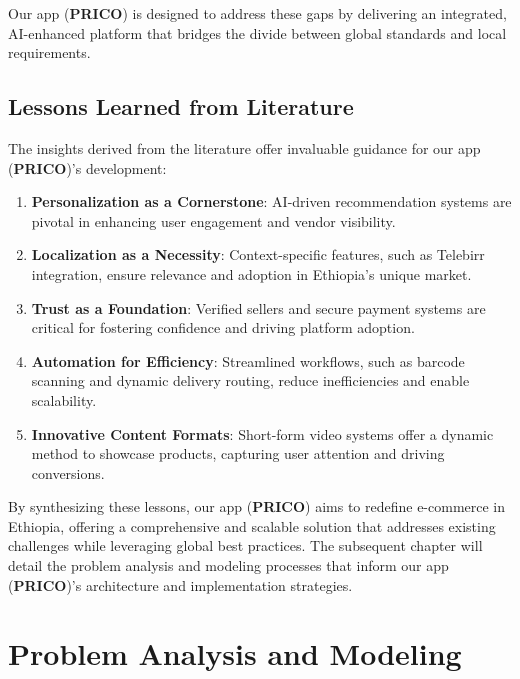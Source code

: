 \documentclass[12pt]{report}
\begin{document}
Our app (\textbf{PRICO}) is designed to address these gaps by delivering an integrated, AI-enhanced
platform that bridges the divide between global standards and local requirements.

\section{Lessons Learned from Literature}

The insights derived from the literature offer invaluable guidance for our app (\textbf{PRICO})’s
development:

\begin{enumerate}

	\item \textbf{Personalization as a Cornerstone}: AI-driven recommendation systems are pivotal in
	      enhancing user engagement and vendor visibility.
	\item \textbf{Localization as a Necessity}: Context-specific features, such as Telebirr integration,
	      ensure relevance and adoption in Ethiopia’s unique market.
	\item \textbf{Trust as a Foundation}: Verified sellers and secure payment systems are critical for
	      fostering confidence and driving platform adoption.
	\item \textbf{Automation for Efficiency}: Streamlined workflows, such as barcode scanning and
	      dynamic delivery routing, reduce inefficiencies and enable scalability.
	\item \textbf{Innovative Content Formats}: Short-form video systems offer a dynamic method to
	      showcase products, capturing user attention and driving conversions. \cite{c19}

\end{enumerate}

By synthesizing these lessons, our app (\textbf{PRICO}) aims to redefine e-commerce in Ethiopia,
offering a comprehensive and scalable solution that addresses existing challenges while
leveraging global best practices. The subsequent chapter will detail the problem analysis and
modeling processes that inform our app (\textbf{PRICO})’s architecture and implementation
strategies.

\chapter{Problem Analysis and Modeling}

\newpage

\nocite{*}


\end{document}
